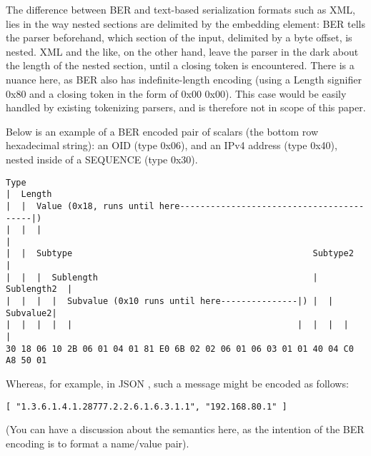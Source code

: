 The difference between BER and text-based serialization formats such as 
XML, lies in the way nested sections are delimited by the embedding 
element: BER tells the parser beforehand, which section of the input, 
delimited by a byte offset, is nested. XML and the like, on the other 
hand, leave the parser in the dark about the length of the nested section, 
until a closing token is encountered. There is a nuance here, as BER
also has indefinite-length encoding (using a Length signifier 0x80 and
a closing token in the form of 0x00 0x00). This case would be easily
handled by existing tokenizing parsers, and is therefore not in scope of
this paper.

Below is an example of a BER encoded pair of scalars
(the bottom row hexadecimal string): an
OID (type 0x06), and an IPv4 address (type 0x40), nested inside of
a SEQUENCE (type 0x30).

\begin{changemargin}{-60mm}{0mm}
\begin{myquote}
\begin{verbatim}
Type
|  Length
|  |  Value (0x18, runs until here-----------------------------------------|)
|  |  |                                                                    |
|  |  Subtype                                               Subtype2       |
|  |  |  Sublength                                          |  Sublength2  |
|  |  |  |  Subvalue (0x10 runs until here---------------|) |  |  Subvalue2|
|  |  |  |  |                                            |  |  |  |        |
30 18 06 10 2B 06 01 04 01 81 E0 6B 02 02 06 01 06 03 01 01 40 04 C0 A8 50 01
\end{verbatim}
\end{myquote}
\end{changemargin}

Whereas, for example, in JSON \cite{bib:json},
such a message might be encoded as follows:

\begin{changemargin}{-60mm}{0mm}
\begin{myquote}
\begin{verbatim}
[ "1.3.6.1.4.1.28777.2.2.6.1.6.3.1.1", "192.168.80.1" ]
\end{verbatim}
\end{myquote}
\end{changemargin}

(You can have a discussion about the semantics here, as the intention of
the BER encoding is to format a name/value pair).

